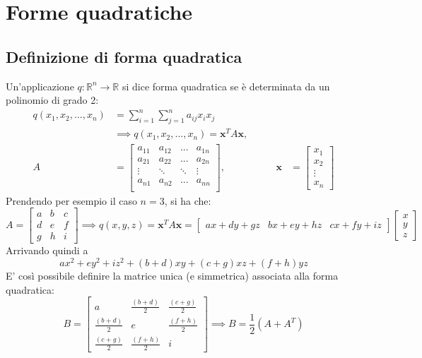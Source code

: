 
\section{Forme quadratiche} \label{sec:quadform}
\subsection{Definizione di forma quadratica} \label{subsec:quadformdef}
    Un'applicazione $q: \mathbb{R}^{n} \rightarrow \mathbb{R}$ si dice forma quadratica se è determinata da un polinomio di grado 2:
    \[
        \begin{aligned}
        q(x_1, x_2, ..., x_n)
            &= \sum_{i = 1}^{n} \sum_{j = 1}^{n} a_{ij} x_i x_j \\
            &\implies q(x_1, x_2, ..., x_n) = \mathbf{x}^{T} A \mathbf{x}, \\
        A &= \begin{bmatrix}
            a_{11} & a_{12} & ... & a_{1n} \\
            a_{21} & a_{22} & ... & a_{2n} \\
            \vdots & \ddots & \ddots & \vdots \\
            a_{n1} & a_{n2} & ... & a_{nn} \\
        \end{bmatrix},
        &\qquad
        \mathbf{x} &= \begin{bmatrix}
            x_1 \\
            x_2 \\
            \vdots \\
            x_n
        \end{bmatrix}
        \end{aligned}
    \]
    Prendendo per esempio il caso $n = 3$, si ha che:
    \[
        A = \begin{bmatrix}
            a & b & c \\
            d & e & f \\
            g & h & i
        \end{bmatrix}
        \implies
        q(x, y ,z) = \mathbf{x}^{T} A \mathbf{x} = \begin{bmatrix} ax + dy + gz & bx + ey + hz & cx + fy + iz \end{bmatrix} \begin{bmatrix} x \\ y \\ z \end{bmatrix}
    \]
    Arrivando quindi a
    \[
        ax^2 + ey^2 + iz^2 + (b + d)xy + (c + g)xz + (f + h)yz
    \]
    E' così possibile definire la matrice unica (e simmetrica) associata alla forma quadratica:
    \[
        B = \begin{bmatrix}
            a & \frac{(b+d)}{2} & \frac{(c+g)}{2} \\
            \frac{(b+d)}{2} & e & \frac{(f+h)}{2} \\
            \frac{(c+g)}{2} & \frac{(f+h)}{2} & i
        \end{bmatrix}
        \implies
        B = \frac{1}{2} (A + A^T)
    \]



